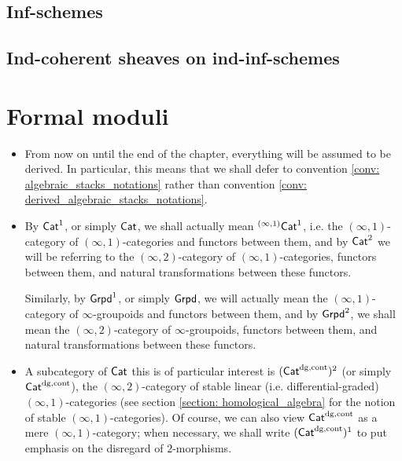         \subsection{Inf-schemes}
        
        \subsection{Ind-coherent sheaves on ind-inf-schemes}
        
    \section{Formal moduli}
        \begin{convention} \label{conv: moduli_everything_is_derived}
            \noindent
            \begin{itemize}
                \item From now on until the end of the chapter, everything will be assumed to be derived. In particular, this means that we shall defer to convention \ref{conv: algebraic_stacks_notations} rather than convention \ref{conv: derived_algebraic_stacks_notations}.
                \item By $\mathsf{Cat}^1$, or simply $\mathsf{Cat}$, we shall actually mean ${}^{(\infty, 1)}\mathsf{Cat}^1$, i.e. the $(\infty, 1)$-category of $(\infty, 1)$-categories and functors between them, and by $\mathsf{Cat}^2$ we will be referring to the $(\infty, 2)$-category of $(\infty, 1)$-categories, functors between them, and natural transformations between these functors. 
                
                Similarly, by $\mathsf{Grpd}^1$, or simply $\mathsf{Grpd}$, we will actually mean the $(\infty, 1)$-category of $\infty$-groupoids and functors between them, and by $\mathsf{Grpd}^2$, we shall mean the $(\infty, 2)$-category of $\infty$-groupoids, functors between them, and natural transformations between these functors.
                \item A subcategory of $\mathsf{Cat}$ this is of particular interest is $(\mathsf{Cat}^{\mathrm{dg}, \mathrm{cont}})^2$ (or simply $\mathsf{Cat}^{\mathrm{dg}, \mathrm{cont}}$), the $(\infty, 2)$-category of stable linear (i.e. differential-graded) $(\infty, 1)$-categories (see section \ref{section: homological_algebra} for the notion of stable $(\infty, 1)$-categories). Of course, we can also view $\mathsf{Cat}^{\mathrm{dg}, \mathrm{cont}}$ as a mere $(\infty, 1)$-category; when necessary, we shall write $(\mathsf{Cat}^{\mathrm{dg}, \mathrm{cont}})^1$ to put emphasis on the disregard of $2$-morphisms.
            \end{itemize} 
        \end{convention}
    
